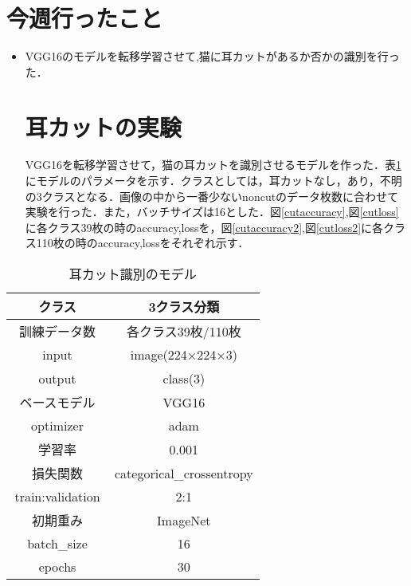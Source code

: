 \documentclass[twocolumn,a4paper,dvipdfmx]{ujarticle}     %
\begin{document}

\section{今週行ったこと}
\begin{itemize}
	
	\item VGG16のモデルを転移学習させて,猫に耳カットがあるか否かの識別を行った．
	\section{耳カットの実験}
	VGG16を転移学習させて，猫の耳カットを識別させるモデルを作った．表\ref{tab:mimicut}にモデルのパラメータを示す．クラスとしては，耳カットなし，あり，不明の3クラスとなる．画像の中から一番少ないnoncutのデータ枚数に合わせて実験を行った．また，バッチサイズは16とした．図\ref{cutaccuracy},図\ref{cutloss}に各クラス39枚の時のaccuracy,lossを，図\ref{cutaccuracy2},図\ref{cutloss2}に各クラス110枚の時のaccuracy,lossをそれぞれ示す．
\end{itemize}
\begin{table}[htb]
	\begin{center}
		
		\caption{耳カット識別のモデル\label{tab:mimicut}}
		\begin{tabular}{|c|c|} \hline
			クラス & 3クラス分類 \\ \hline \hline
			訓練データ数　& 各クラス39枚/110枚\\
			input & image(224×224×3) \\
			output & class(3)　\\
			ベースモデル & VGG16 \\
			optimizer & adam \\
			学習率　& 0.001\\
			損失関数 & categorical\_crossentropy\\ 
			train:validation & 2:1\\
			初期重み & ImageNet \\
			batch\_size & 16 \\
			epochs & 30 \\ \hline
		\end{tabular}
	\end{center}
\end{table}
\end{document}
